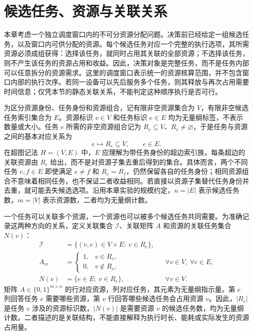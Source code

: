 \section{候选任务、资源与关联关系}
\label{sec:02_01}

本章考虑一个独立调度窗口内的不可分资源分配问题。决策前已经给定一组候选任务，以及窗口内可供分配的资源。每个候选任务对应一个完整的执行选项，其所需资源必须成组获得：选择该任务，就同时占用其关联的全部资源；不选择该任务，则不产生该任务的资源占用和收益。因此，决策对象是完整任务，而不是任务内部可以任意拆分的资源需求。这里的调度窗口表示统一的资源核算范围，并不包含窗口内部的执行次序。若同一设备可以先后服务多个任务，则其释放与再次占用需要时间信息；仅凭本节的静态关联关系，不能判定这种顺序执行是否可行。

为区分资源身份、任务身份和资源组合，记有限非空资源集合为 $V$，有限非空候选任务索引集合为 $E$。资源标识 $v\in V$ 和任务标识 $e\in E$ 均为无量纲标签，不表示数量或大小。任务 $e$ 所需的非空资源组合记为 $R_e\subseteq V$、$R_e\ne\varnothing$，于是任务与资源之间的基本对应关系为
\begin{equation}
 e\longmapsto R_e\subseteq V,\qquad e\in E.
 \label{s0201:resource_mapping}
\end{equation}
在超图记法 $H=(V,E)$ 中，$E$ 应理解为带任务身份的超边索引族，每条超边的关联资源由 $R_e$ 给出，而不是对资源子集去重后得到的集合。具体而言，两个不同任务 $e,f\in E$ 即使满足 $e\ne f$ 和 $R_e=R_f$，仍然保留各自的任务身份；相同资源组合不意味着相同任务，也不保证二者收益相同。若直接以资源子集替代任务身份并去重，就可能丢失候选选项。沿用本章实验的规模约定，$n=|E|$ 表示候选任务数，$m=|V|$ 表示资源数，二者均为无量纲计数。

一个任务可以关联多个资源，一个资源也可以被多个候选任务共同需要。为准确记录这两种方向的关系，定义关联集合 $\mathcal I$、关联矩阵 $A$ 和资源的关联任务集合 $N(v)$：
\begin{align}
 \mathcal I
 &=\{(v,e)\in V\times E:\ v\in R_e\},
 \label{s0201:incidence_set}\\
 A_{ve}
 &=\begin{cases}
 1,&v\in R_e,\\
 0,&v\notin R_e,
 \end{cases}
 &&\forall v\in V,\ \forall e\in E,
 \label{s0201:incidence_matrix}\\
 N(v)
 &=\{e\in E:\ v\in R_e\},
 &&\forall v\in V.
 \label{s0201:resource_neighborhood}
\end{align}
矩阵 $A\in\{0,1\}^{m\times n}$ 的行对应资源，列对应任务，其元素为无量纲指示量。第 $e$ 列回答任务 $e$ 需要哪些资源，第 $v$ 行回答哪些候选任务会占用资源 $v$。因此，$|R_e|$ 是任务 $e$ 涉及的资源标识数，$|N(v)|$ 是需要资源 $v$ 的候选任务数，均为无量纲计数。二者描述的是关联结构，不能直接解释为执行时长、能耗或实际发生的资源占用量。

